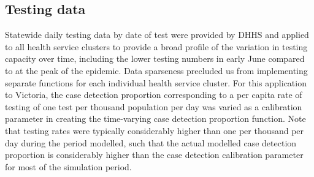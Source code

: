 \subsection{Testing data}
Statewide daily testing data by date of test were provided by DHHS and applied to all health service clusters to provide a broad profile of the variation in testing capacity over time, including the lower testing numbers in early June compared to at the peak of the epidemic. Data sparseness precluded us from implementing separate functions for each individual health service cluster. For this application to Victoria, the case detection proportion corresponding to a per capita rate of testing of one test per thousand population per day was varied as a calibration parameter in creating the time-varying case detection proportion function. Note that testing rates were typically considerably higher than one per thousand per day during the period modelled, such that the actual modelled case detection proportion is considerably higher than the case detection calibration parameter for most of the simulation period.